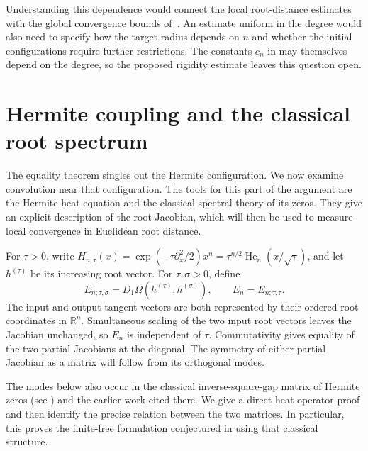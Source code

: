 \documentclass[12pt,reqno]{amsart}
\theoremstyle{definition}
\theoremstyle{remark}
\newcommand{\R}{\mathbb R}
\newcommand{\He}{\operatorname{He}}
\begin{document}
Understanding this dependence would connect the local root-distance
estimates with the global convergence bounds of~\cite{AP20BerryEsseen}. An estimate uniform in the degree would also need to specify how the target radius depends on \(n\) and whether the initial configurations require further restrictions. The constants \(c_n\) in  may themselves depend on the degree, so the proposed rigidity estimate leaves this question open.

\appendix

\section{Hermite coupling and the classical root spectrum}
\label{sec:spectrum}

The equality theorem singles out the Hermite configuration.  We now examine
convolution near that configuration.  The tools for this part of the argument
are the Hermite heat equation and the classical spectral theory of its zeros.
They give an explicit description of the root Jacobian, which will then be
used to measure local convergence in Euclidean root distance.

For \(\tau>0\), write
\(H_{n,\tau}(x)=\exp(-\tau\partial_x^2/2)x^n
=\tau^{n/2}\He_n(x/\sqrt\tau)\), and let \(h^{(\tau)}\) be its
increasing root vector.  For \(\tau,\sigma>0\), define
\begin{equation}\label{eq:En-definition}
 E_{n;\tau,\sigma}=D_1\Omega(h^{(\tau)},h^{(\sigma)}),
 \qquad E_n=E_{n;\tau,\tau}.
\end{equation}
The input and output tangent vectors are both represented by their ordered
root coordinates in \(\R^n\).  Simultaneous scaling of the two input root
vectors leaves the Jacobian unchanged, so \(E_n\) is independent of \(\tau\).
Commutativity gives equality of the two partial Jacobians at the diagonal.
The symmetry of either partial Jacobian as a matrix will follow from its
orthogonal modes.

The modes below also occur in the classical inverse-square-gap matrix of
Hermite zeros (see \cite[\S4.1, equations (4.5)--(4.7)]{Sasaki15}) and the
earlier work cited there. We give a direct heat-operator proof and then
identify the precise relation between the two matrices. In particular, this proves the finite-free formulation conjectured in \cite[Conjecture~4.1]{Hashemi26PStam} using that classical structure.
\end{document}
